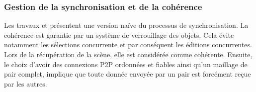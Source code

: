 %
%
%
%
%

\subsubsection{Gestion de la synchronisation et de la cohérence}
\label{sec:synchronisation-client-serveur}

Les travaux \cite{Desprat2015a} et \cite{Desprat2015b} présentent une version 
naïve du processus de synchronisation. La cohérence est garantie par un système 
de verrouillage des objets. Cela évite notamment les sélections concurrente et par 
conséquent les éditions concurrentes. 
Lors de la récupération de la scène, elle est considérée comme cohérente. 
Ensuite, le choix d'avoir des connexions \gls{P2P} ordonnées et fiables ainsi qu'un 
maillage de pair complet, implique que toute donnée envoyée par un pair est 
forcément reçue par les autres. 

